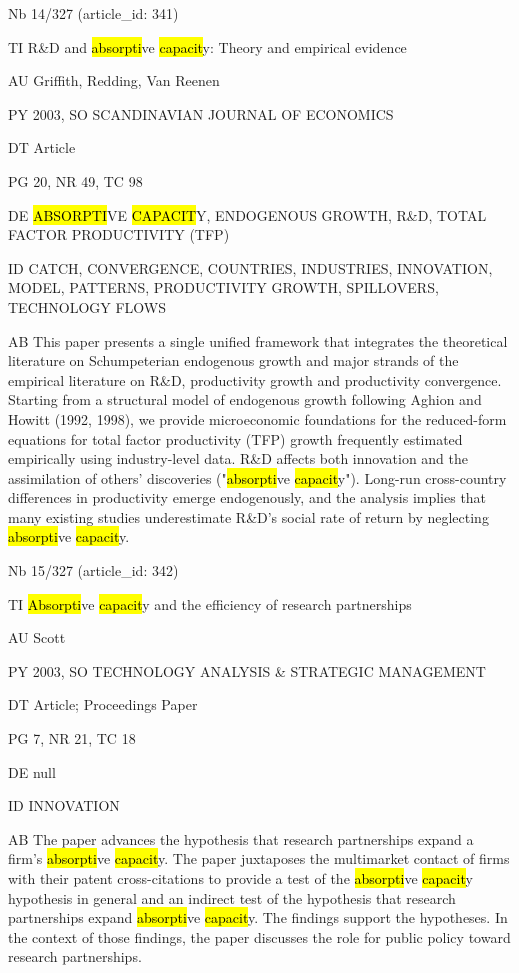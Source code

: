 \documentclass[a4paper]{article}
\begin{document}
\vspace*{-2cm}
Nb \tabto{0cm}14/327 (article\_id: 341)\par
TI \tabto{0cm}R\&D and \hl{absorpti}ve \hl{capacit}y: Theory and empirical evidence\par
AU \tabto{0cm}Griffith, Redding, Van Reenen\par
PY \tabto{0cm}2003, SO SCANDINAVIAN JOURNAL OF ECONOMICS\par
DT \tabto{0cm}Article\par
PG \tabto{0cm}20, NR 49, TC 98\par
DE \tabto{0cm}\hl{ABSORPTI}VE \hl{CAPACIT}Y, ENDOGENOUS GROWTH, R\&D, TOTAL FACTOR PRODUCTIVITY (TFP)\par
ID \tabto{0cm}CATCH, CONVERGENCE, COUNTRIES, INDUSTRIES, INNOVATION, MODEL, PATTERNS, PRODUCTIVITY GROWTH, SPILLOVERS, TECHNOLOGY FLOWS\par
AB \tabto{0cm}This paper presents a single unified framework that integrates the theoretical literature on Schumpeterian endogenous growth and major strands of the empirical literature on R\&D, productivity growth and productivity convergence. Starting from a structural model of endogenous growth following Aghion and Howitt (1992, 1998), we provide microeconomic foundations for the reduced-form equations for total factor productivity (TFP) growth frequently estimated empirically using industry-level data. R\&D affects both innovation and the assimilation of others' discoveries ("\hl{absorpti}ve \hl{capacit}y"). Long-run cross-country differences in productivity emerge endogenously, and the analysis implies that many existing studies underestimate R\&D's social rate of return by neglecting \hl{absorpti}ve \hl{capacit}y.\par
\clearpage

\vspace*{-2cm}
Nb \tabto{0cm}15/327 (article\_id: 342)\par
TI \tabto{0cm}\hl{Absorpti}ve \hl{capacit}y and the efficiency of research partnerships\par
AU \tabto{0cm}Scott\par
PY \tabto{0cm}2003, SO TECHNOLOGY ANALYSIS \& STRATEGIC MANAGEMENT\par
DT \tabto{0cm}Article; Proceedings Paper\par
PG \tabto{0cm}7, NR 21, TC 18\par
DE \tabto{0cm}null\par
ID \tabto{0cm}INNOVATION\par
AB \tabto{0cm}The paper advances the hypothesis that research partnerships expand a firm's \hl{absorpti}ve \hl{capacit}y. The paper juxtaposes the multimarket contact of firms with their patent cross-citations to provide a test of the \hl{absorpti}ve \hl{capacit}y hypothesis in general and an indirect test of the hypothesis that research partnerships expand \hl{absorpti}ve \hl{capacit}y. The findings support the hypotheses. In the context of those findings, the paper discusses the role for public policy toward research partnerships.\par
\clearpage
\end{document}
